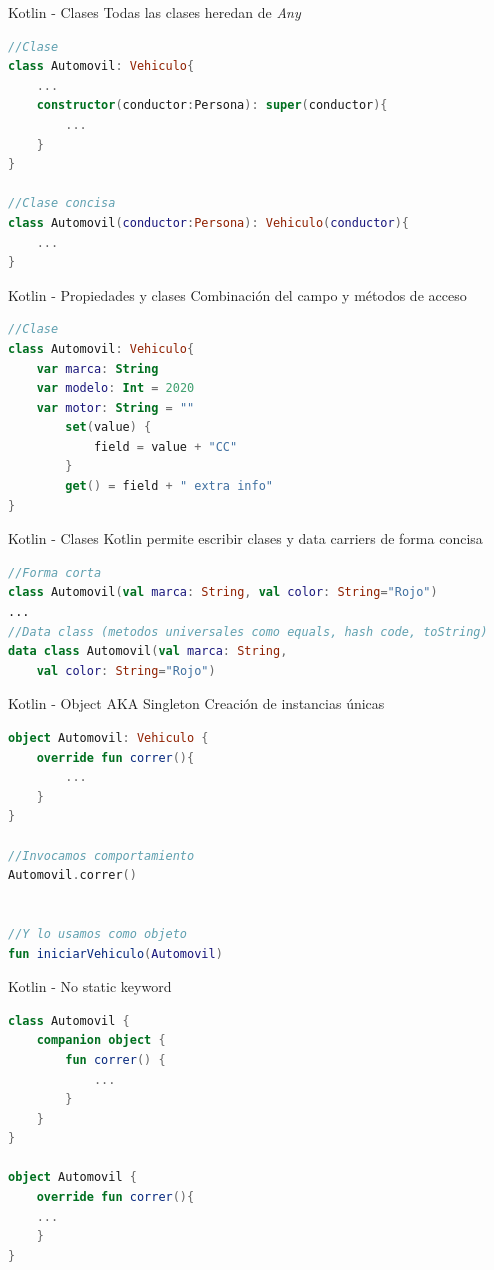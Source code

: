 \documentclass[aspectratio=169]{beamer}
\begin{document}
\begin{frame}[fragile]{Kotlin - Clases}
Todas las clases heredan de \textit{Any}
\begin{lstlisting}[language=Kotlin]
//Clase
class Automovil: Vehiculo{
    ...
    constructor(conductor:Persona): super(conductor){
        ...
    }
}

//Clase concisa
class Automovil(conductor:Persona): Vehiculo(conductor){
    ...
}
\end{lstlisting}

\end{frame}

\begin{frame}[fragile]{Kotlin - Propiedades y clases}
Combinación del campo y métodos de acceso    
\begin{lstlisting}[language=Kotlin]
//Clase
class Automovil: Vehiculo{
    var marca: String
    var modelo: Int = 2020
    var motor: String = ""
        set(value) {
            field = value + "CC"
        }
        get() = field + " extra info"
}
\end{lstlisting}

\end{frame}

\begin{frame}[fragile]{Kotlin - Clases}
Kotlin permite escribir clases y data carriers de forma concisa
\begin{lstlisting}[language=Kotlin]    
//Forma corta
class Automovil(val marca: String, val color: String="Rojo")
...
//Data class (metodos universales como equals, hash code, toString)
data class Automovil(val marca: String,
    val color: String="Rojo")
\end{lstlisting}

\end{frame}


\begin{frame}[fragile]{Kotlin - Object AKA Singleton}
Creación de instancias únicas
\begin{lstlisting}[language=Kotlin]    
object Automovil: Vehiculo {
    override fun correr(){
        ...
    }
}

//Invocamos comportamiento
Automovil.correr()


//Y lo usamos como objeto
fun iniciarVehiculo(Automovil)
\end{lstlisting}
    
\end{frame}

\begin{frame}[fragile]{Kotlin - No static keyword}
    
\begin{lstlisting}[language=Kotlin]
class Automovil {
    companion object {
        fun correr() {
            ...
        }
    }
}

object Automovil {
    override fun correr(){
    ...
    }
}
\end{lstlisting}
    
\end{frame}
\end{document}
